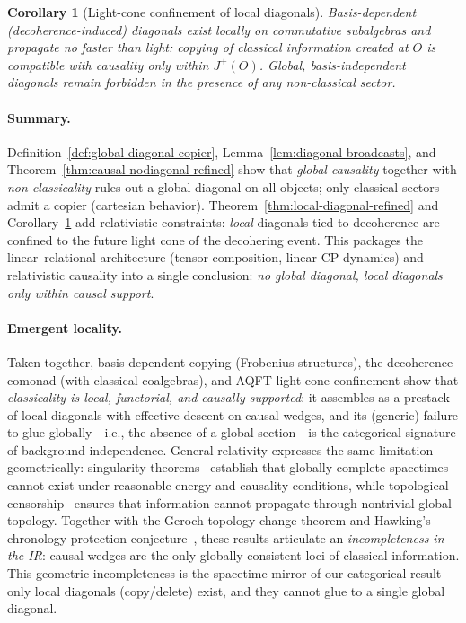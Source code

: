 \documentclass[11pt]{article}
\theoremstyle{upright}
\newtheorem{corollary}{Corollary}
\begin{document}
\begin{corollary}[Light-cone confinement of local diagonals]
\label{cor:lightcone-refined}
Basis-dependent (decoherence-induced) diagonals exist locally on commutative subalgebras and propagate no faster than light: copying of classical information created at $O$ is compatible with causality only within $J^+(O)$. Global, basis-independent diagonals remain forbidden in the presence of any non-classical sector.
\end{corollary}

\paragraph{Summary.}
Definition~\ref{def:global-diagonal-copier}, Lemma~\ref{lem:diagonal-broadcasts}, and Theorem~\ref{thm:causal-nodiagonal-refined} show that \emph{global causality} together with \emph{non-classicality} rules out a global diagonal on all objects; only classical sectors admit a copier (cartesian behavior). Theorem~\ref{thm:local-diagonal-refined} and Corollary~\ref{cor:lightcone-refined} add relativistic constraints: \emph{local} diagonals tied to decoherence are confined to the future light cone of the decohering event. This packages the linear--relational architecture (tensor composition, linear CP dynamics) and relativistic causality into a single conclusion: \emph{no global diagonal, local diagonals only within causal support}.

\paragraph{Emergent locality.}
Taken together, basis-dependent copying (Frobenius structures), the decoherence comonad (with classical coalgebras), and AQFT light-cone confinement show that \emph{classicality is local, functorial, and causally supported}: it assembles as a prestack of local diagonals with effective descent on causal wedges, and its (generic) failure to glue globally—i.e., the absence of a global section—is the categorical signature of background independence.
General relativity expresses the same limitation geometrically: singularity theorems~\cite{Penrose1965,HawkingPenrose1970} establish that globally complete spacetimes cannot exist under reasonable energy and causality conditions, while topological censorship~\cite{FriedmanSchleichWitt1993,Galloway1999} ensures that information cannot propagate through nontrivial global topology.
Together with the Geroch topology-change theorem and Hawking’s chronology protection conjecture~\cite{Geroch1967,Hawking1992}, these results articulate an \emph{incompleteness in the IR}: causal wedges are the only globally consistent loci of classical information. This geometric incompleteness is the spacetime mirror of our categorical result—only local diagonals (copy/delete) exist, and they cannot glue to a single global diagonal.
\end{document}
